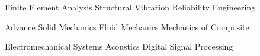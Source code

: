 
\begin{coursework}


  \cvcoursev
    {Finite Element Analysis}
    {Structural Vibration}
    {Reliability Engineering}

  \cvcoursev
    {Advance Solid Mechanics}
    {Fluid Mechanics}
    {Mechanics of Composite}
   
  \cvcoursev
    {Electromechanical Systems}
    {Acoustics}
    {Digital Signal Processing}
\end{coursework}
